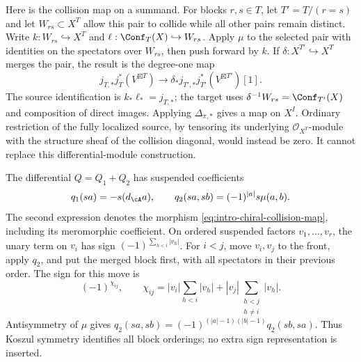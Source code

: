 Here is the collision map on a summand. For blocks $r,s\in T$,
let $T'=T/(r=s)$ and let $W_{rs}\subset X^T$ allow this pair
to collide while all other pairs remain distinct. Write
$k:W_{rs}\hookrightarrow X^T$ and
$\ell:\Conf_T(X)\hookrightarrow W_{rs}$.
Apply $\mu$ to the selected pair with identities on the spectators
over $W_{rs}$, then push forward by $k$. If
$\delta:X^{T'}\hookrightarrow X^T$ merges the pair, the result is
the degree-one map
\begin{equation}\label{eq:intro-chiral-collision-map}
 j_{T,*}j_T^*(V^{\boxtimes T})
 \longrightarrow
 \delta_*j_{T',*}j_{T'}^*(V^{\boxtimes T'})[1].
\end{equation}
The source identification is $k_*\ell_*=j_{T,*}$; the target
uses $\delta^{-1}W_{rs}=\Conf_{T'}(X)$ and composition of
direct images. Applying $\Delta_{\pi,*}$ gives a map on $X^I$.
Ordinary restriction of the fully localized source, by tensoring
its underlying $\mathcal O_{X^T}$-module with the structure sheaf
of the collision diagonal, would instead be zero. It cannot
replace this differential-module construction.

The differential $Q=Q_1+Q_2$ has suspended coefficients
\[
 q_1(sa)=-s(d_{\cA}a),\qquad
 q_2(sa,sb)=(-1)^{|a|}s\mu(a,b).
\]
The second expression denotes the morphism
\eqref{eq:intro-chiral-collision-map}, including its meromorphic
coefficient. On ordered suspended factors $v_1,\ldots,v_r$,
the unary term on $v_i$ has sign
$(-1)^{\sum_{h<i}|v_h|}$. For $i<j$, move $v_i,v_j$ to the
front, apply $q_2$, and put the merged block first, with all
spectators in their previous order. The sign for this move is
\[
 (-1)^{\chi_{ij}},\qquad
 \chi_{ij}=|v_i|\sum_{h<i}|v_h|
       +|v_j|\sum_{\substack{h<j\\h\ne i}}|v_h|.
\]
Antisymmetry of $\mu$ gives
$q_2(sa,sb)=(-1)^{(|a|-1)(|b|-1)}q_2(sb,sa)$.
Thus Koszul symmetry identifies all block orderings; no extra
sign representation is inserted.

